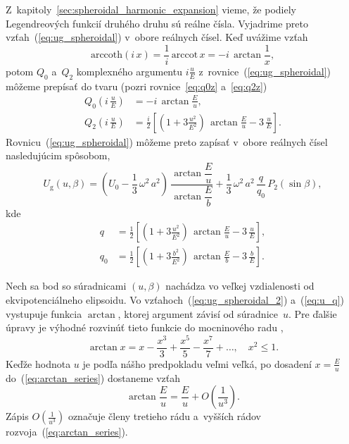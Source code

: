 \documentclass[a4paper, 12pt]{book}
\newcommand{\gidx}{\mathrm g}
\begin{document}
Z~kapitoly~\ref{sec:spheroidal_harmonic_expansion} vieme, že podiely 
Legendreových funkcií druhého druhu sú reálne čísla.  Vyjadrime preto 
vzťah~(\ref{eq:ug_spheroidal}) v~obore reálnych čísel.  Keď uvážime vzťah 
\parencite{Moritz1967}
%
\begin{equation}
\mathrm{arccoth} (i \, x) = \frac{1}{i} \, \mathrm{arccot} \, x = -i \, 
\arctan\frac{1}{x}{,}
\end{equation}
%
potom $Q_0$ a~$Q_2$ komplexného argumentu $i \frac{u}{E}$ 
z~rovnice~(\ref{eq:ug_spheroidal}) môžeme prepísať do tvaru (pozri 
rovnice~\ref{eq:q0z} a~\ref{eq:q2z})
%
\begin{align}
Q_0\left( i \, \frac{u}{E} \right) &= -i \, \arctan\frac{E}{u}{,}\\
%
Q_2\left( i \, \frac{u}{E} \right) &= \frac{i}{2} \left[ \left( 
1 + 3 \frac{u^2}{E^2} \right) \, \arctan\frac{E}{u} - 3 \, \frac{u}{E} 
\right]{.}
\end{align}
%
Rovnicu~(\ref{eq:ug_spheroidal}) môžeme preto zapísať v~obore reálnych čísel 
nasledujúcim spôsobom,
%
\begin{equation}
\label{eq:ug_spheroidal_2}
U_\gidx(u, \beta) = \left( U_0 - \frac{1}{3} \, \omega^2 \, a^2 \right) \, 
\frac{\arctan\dfrac{E}{u}}{\arctan\dfrac{E}{b}} + \frac{1}{3} \, \omega^2 \, 
a^2 \, \frac{q}{q_0} \, P_2(\sin\beta){,}
\end{equation}
%
kde
%
\begin{align}
\label{eq:u_q}
q &= \frac{1}{2} \left[ \left( 1 + 3 \frac{u^2}{E^2} \right) \, 
\arctan\frac{E}{u} - 3 \, \frac{u}{E} \right]{,}\\
%
q_0 &= \frac{1}{2} \left[ \left( 1 + 3 \frac{b^2}{E^2} \right) \, 
\arctan\frac{E}{b} - 3 \, \frac{b}{E} \right]{.}
\end{align}

Nech sa bod so súradnicami $(u, \beta)$ nachádza vo veľkej vzdialenosti od 
ekvipotenciálneho elipsoidu.  Vo vzťahoch~(\ref{eq:ug_spheroidal_2}) 
a~(\ref{eq:u_q}) vystupuje funkcia $\arctan$, ktorej argument závisí od 
súradnice~$u$.  Pre ďalšie úpravy je výhodné rozvinúť tieto funkcie do 
mocninového radu \parencite{Gradshteyn2007},
%
\begin{equation}
\label{eq:arctan_series}
\arctan x = x - \frac{x^3}{3} + \frac{x^5}{5} - \frac{x^7}{7} + \dots{,} \quad 
x^2 \leq 1{.}
\end{equation}
%
Keďže hodnota $u$ je podľa nášho predpokladu veľmi veľká, po dosadení $x 
= \frac{E}{u}$ do~(\ref{eq:arctan_series}) dostaneme vzťah
%
\begin{equation}
\label{eq:eu_atan}
\arctan\frac{E}{u} = \frac{E}{u} + O\left( \frac{1}{u^3} \right){.}
\end{equation}
%
Zápis $O\left( \frac{1}{u^3} \right)$ označuje členy tretieho rádu a~vyšších 
rádov rozvoja~(\ref{eq:arctan_series}).
\end{document}
